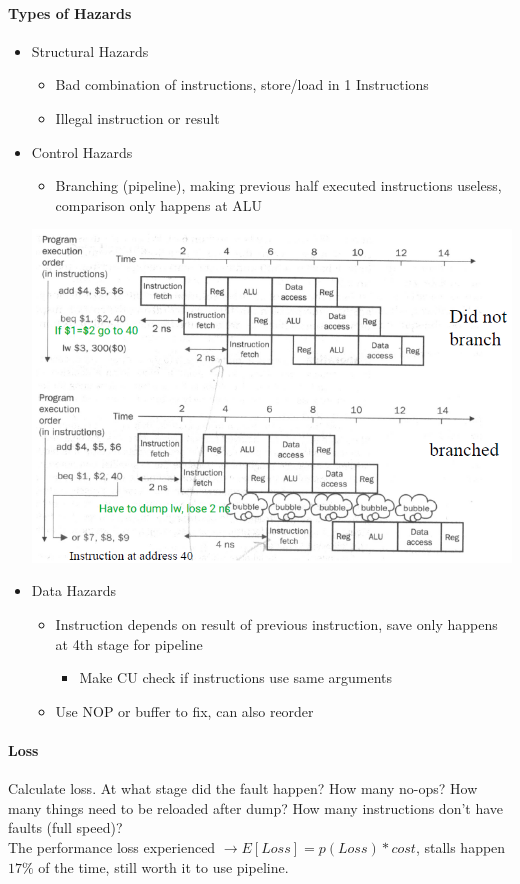 \documentclass[12 pt]{article}
\begin{document}
\paragraph{Types of Hazards}
\begin{itemize}
\item Structural Hazards
\begin{itemize}
\item Bad combination of instructions, store/load in 1 Instructions
\item Illegal instruction or result
\end{itemize}
\item Control Hazards
\begin{itemize}
\item Branching (pipeline), making previous half executed instructions useless, comparison only happens at ALU
\end{itemize}
\includegraphics[scale=0.5]{bha}
\item Data Hazards
\begin{itemize}
\item Instruction depends on result of previous instruction, save only happens at 4th stage for pipeline
\begin{itemize}
\item Make CU check if instructions use same arguments
\end{itemize}
\item Use NOP or buffer to fix, can also reorder
\end{itemize}
\end{itemize}
\paragraph{Loss}
Calculate loss. At what stage did the fault happen? How many no-ops? How many things need to be reloaded after dump? How many instructions don't have faults (full speed)?
\\ The performance loss experienced $\to E[Loss]=p(Loss)*cost$, stalls happen $17\%$ of the time, still worth it to use pipeline.
\end{document}
